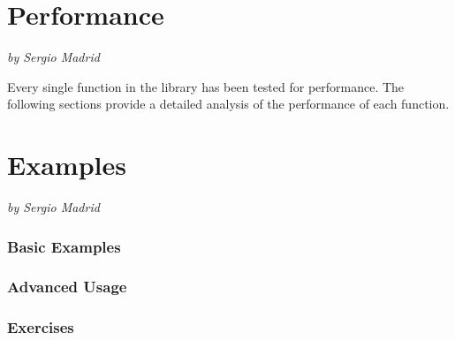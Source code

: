 \documentclass[a4paper,oneside]{article}
\newcommand{\authoredpart}[2]{
  \clearpage
  \part{#1}
  \vspace{-1em} %
  \large{\textit{by #2}}
  \vspace{2em} %
}
\begin{document}
\authoredpart{Performance}{Sergio Madrid}

Every single function in the library has been tested for performance. The following sections provide a detailed analysis of the performance of each function.

\authoredpart{Examples}{Sergio Madrid}

\section{Basic Examples}

\section{Advanced Usage}

\section{Exercises}

\end{document}
